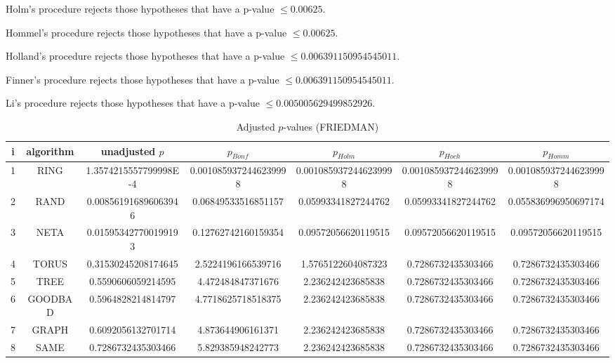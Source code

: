\documentclass[a4paper,10pt]{article}
\begin{document}
\begin{landscape}
Holm's procedure rejects those hypotheses that have a p-value $\le0.00625$.


Hommel's procedure rejects those hypotheses that have a p-value $\le0.00625$.


Holland's procedure rejects those hypotheses that have a p-value $\le0.006391150954545011$.


Finner's procedure rejects those hypotheses that have a p-value $\le0.006391150954545011$.


Li's procedure rejects those hypotheses that have a p-value $\le0.005005629499852926$.



\newpage

\begin{table}[!htp]
\centering\scriptsize
\caption{Adjusted $p$-values (FRIEDMAN)}
\begin{tabular}{ccccccc}
i&algorithm&unadjusted $p$&$p_{Bonf}$&$p_{Holm}$&$p_{Hoch}$&$p_{Homm}$\\
\hline
1& RING&1.3574215557799998E-4&0.0010859372446239998&0.0010859372446239998&0.0010859372446239998&0.0010859372446239998\\
2& RAND&0.008561916896063946&0.06849533516851157&0.05993341827244762&0.05993341827244762&0.055836996950697174\\
3& NETA&0.015953427700199193&0.12762742160159354&0.09572056620119515&0.09572056620119515&0.09572056620119515\\
4& TORUS&0.31530245208174645&2.5224196166539716&1.5765122604087323&0.7286732435303466&0.7286732435303466\\
5& TREE&0.5590606059214595&4.472484847371676&2.236242423685838&0.7286732435303466&0.7286732435303466\\
6& GOODBAD&0.5964828214814797&4.7718625718518375&2.236242423685838&0.7286732435303466&0.7286732435303466\\
7& GRAPH&0.6092056132701714&4.873644906161371&2.236242423685838&0.7286732435303466&0.7286732435303466\\
8& SAME&0.7286732435303466&5.829385948242773&2.236242423685838&0.7286732435303466&0.7286732435303466\\
\hline
\end{tabular}
\end{table}


\end{landscape}
\end{document}
